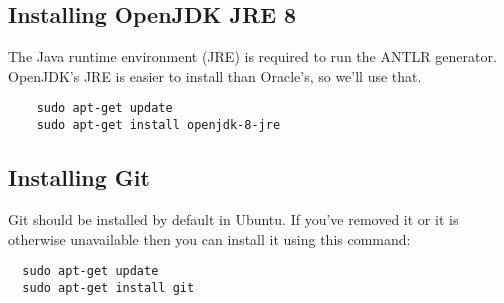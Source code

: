 \documentclass[../setup.tex]{subfiles}
\begin{document}
\subsection{Installing OpenJDK JRE 8}
The Java runtime environment (JRE) is required to run the ANTLR generator. OpenJDK's JRE is easier
to install than Oracle's, so we'll use that.
\begin{lstlisting}
	sudo apt-get update
	sudo apt-get install openjdk-8-jre
\end{lstlisting}

\subsection{Installing Git}
Git should be installed by default in Ubuntu. If you've removed it or it is otherwise unavailable
then you can install it using this command:
\begin{lstlisting}
  sudo apt-get update
  sudo apt-get install git
\end{lstlisting}
\end{document}
